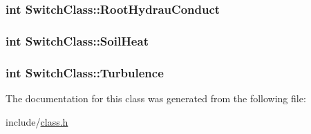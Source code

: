 \subsubsection[{\texorpdfstring{Root\+Hydrau\+Conduct}{RootHydrauConduct}}]{\setlength{\rightskip}{0pt plus 5cm}int Switch\+Class\+::\+Root\+Hydrau\+Conduct}\hypertarget{class_switch_class_af4f7f6f1797b446456b5f6e6f90c6eec}{}\label{class_switch_class_af4f7f6f1797b446456b5f6e6f90c6eec}
\subsubsection[{\texorpdfstring{Soil\+Heat}{SoilHeat}}]{\setlength{\rightskip}{0pt plus 5cm}int Switch\+Class\+::\+Soil\+Heat}\hypertarget{class_switch_class_a68e0110a6aeaf98f55c8589023cc0677}{}\label{class_switch_class_a68e0110a6aeaf98f55c8589023cc0677}
\subsubsection[{\texorpdfstring{Turbulence}{Turbulence}}]{\setlength{\rightskip}{0pt plus 5cm}int Switch\+Class\+::\+Turbulence}\hypertarget{class_switch_class_af9463634e86dee53233d05ca5c792c92}{}\label{class_switch_class_af9463634e86dee53233d05ca5c792c92}


The documentation for this class was generated from the following file\+:\begin{DoxyCompactItemize}
\item 
include/\hyperlink{class_8h}{class.\+h}\end{DoxyCompactItemize}
